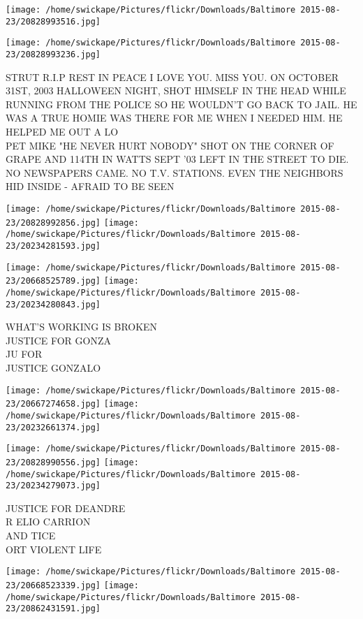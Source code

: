 \documentclass[10pt,letterpaper]{article}
\begin{document}
\texttt{[image: /home/swickape/Pictures/flickr/Downloads/Baltimore 2015-08-23/20828993516.jpg]}

\vspace{0.25in}
\texttt{[image: /home/swickape/Pictures/flickr/Downloads/Baltimore 2015-08-23/20828993236.jpg]}

STRUT R.I.P REST IN PEACE I LOVE YOU.  MISS YOU.  ON OCTOBER 31ST, 2003 HALLOWEEN NIGHT, SHOT HIMSELF IN THE HEAD WHILE RUNNING FROM THE POLICE SO HE WOULDN'T GO BACK TO JAIL.  HE WAS A TRUE HOMIE WAS THERE FOR ME WHEN I NEEDED HIM.  HE HELPED ME OUT A LO\\
PET MIKE "HE NEVER HURT NOBODY" SHOT ON THE CORNER OF GRAPE AND 114TH IN WATTS SEPT '03 LEFT IN THE STREET TO DIE.  NO NEWSPAPERS CAME.  NO T.V. STATIONS.  EVEN THE NEIGHBORS HID INSIDE {-} AFRAID TO BE SEEN
\pagebreak

\texttt{[image: /home/swickape/Pictures/flickr/Downloads/Baltimore 2015-08-23/20828992856.jpg]}
\texttt{[image: /home/swickape/Pictures/flickr/Downloads/Baltimore 2015-08-23/20234281593.jpg]}

\texttt{[image: /home/swickape/Pictures/flickr/Downloads/Baltimore 2015-08-23/20668525789.jpg]}
\texttt{[image: /home/swickape/Pictures/flickr/Downloads/Baltimore 2015-08-23/20234280843.jpg]}

WHAT'S WORKING IS BROKEN\\
JUSTICE FOR GONZA\\
JU FOR\\
JUSTICE GONZALO
\pagebreak

\texttt{[image: /home/swickape/Pictures/flickr/Downloads/Baltimore 2015-08-23/20667274658.jpg]}
\texttt{[image: /home/swickape/Pictures/flickr/Downloads/Baltimore 2015-08-23/20232661374.jpg]}

\texttt{[image: /home/swickape/Pictures/flickr/Downloads/Baltimore 2015-08-23/20828990556.jpg]}
\texttt{[image: /home/swickape/Pictures/flickr/Downloads/Baltimore 2015-08-23/20234279073.jpg]}

JUSTICE FOR DEANDRE\\
R ELIO CARRION\\
AND TICE\\
ORT VIOLENT LIFE
\pagebreak

\texttt{[image: /home/swickape/Pictures/flickr/Downloads/Baltimore 2015-08-23/20668523339.jpg]}
\texttt{[image: /home/swickape/Pictures/flickr/Downloads/Baltimore 2015-08-23/20862431591.jpg]}
\end{document}
